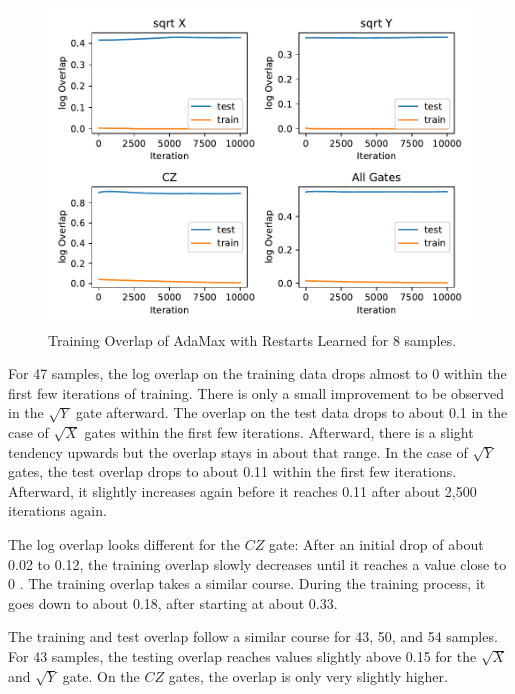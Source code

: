\begin{figure}[H]
  \centering
  \includegraphics[width=\textwidth]{figures/results/AM-restarts-learned/avgOverlap_8.pdf}
  \caption[Training Overlap of AdaMax with Restarts Learned]{Training 
  Overlap of AdaMax with Restarts Learned for 8 samples.}
  \label{fig:am_overlap_8}
\end{figure}

For 47 samples, the log overlap on the training data drops almost to 0 within the first few iterations 
of training. There is only a small improvement to be observed in the $\sqrt{Y}$ gate afterward. 
The overlap on the test data drops to about 0.1 in the case of $\sqrt{X}$ gates within the first few iterations.
Afterward, there is a slight tendency upwards but the overlap stays in about that range. In the case 
of $\sqrt{Y}$ gates, the test overlap drops to about 0.11 within the first few iterations. Afterward, 
it slightly increases again before it reaches 0.11 after about 2,500 iterations again.

The log overlap looks different for the $CZ$ gate: After an initial drop of about 0.02 to 0.12, the 
training overlap slowly decreases until it reaches a value close to 0 . The 
training overlap takes a similar course. During the training process, it goes down to about 0.18, after 
starting at about 0.33.

The training and test overlap follow a similar course for 43, 50, and 54 samples. For 43 samples, the 
testing overlap reaches values slightly above 0.15 for the $\sqrt{X}$ and $\sqrt{Y}$ gate. On the $CZ$ gates, 
the overlap is only very slightly higher.

